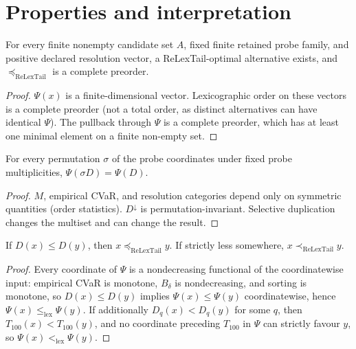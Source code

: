 \section{Properties and interpretation}
\label{sec:theory}
\begin{theorem}
For every finite nonempty candidate set $A$, fixed finite retained probe family, and positive declared resolution vector, a ReLexTail-optimal alternative exists, and $\preceq_{\mathrm{ReLexTail}}$ is a complete preorder.
\end{theorem}
\begin{proof}
$\Psi(x)$ is a finite-dimensional vector. Lexicographic order on these vectors is a complete preorder (not a total order, as distinct alternatives can have identical $\Psi$). The pullback through $\Psi$ is a complete preorder, which has at least one minimal element on a finite non-empty set.
\end{proof}

\begin{theorem}
For every permutation $\sigma$ of the probe coordinates under fixed probe multiplicities, $\Psi(\sigma D) = \Psi(D)$.
\end{theorem}
\begin{proof}
$M$, empirical CVaR, and resolution categories depend only on symmetric quantities (order statistics). $D^\downarrow$ is permutation-invariant. Selective duplication changes the multiset and can change the result.
\end{proof}

\begin{proposition}
If $D(x) \leq D(y)$, then $x \preceq_{\mathrm{ReLexTail}} y$. If strictly less somewhere, $x \prec_{\mathrm{ReLexTail}} y$.
\end{proposition}
\begin{proof}
Every coordinate of $\Psi$ is a nondecreasing functional of the coordinatewise input: empirical CVaR is monotone, $B_\delta$ is nondecreasing, and sorting is monotone, so $D(x) \leq D(y)$ implies $\Psi(x) \leq \Psi(y)$ coordinatewise, hence $\Psi(x) \leq_{\mathrm{lex}} \Psi(y)$. If additionally $D_q(x) < D_q(y)$ for some $q$, then $T_{100}(x) < T_{100}(y)$, and no coordinate preceding $T_{100}$ in $\Psi$ can strictly favour $y$, so $\Psi(x) <_{\mathrm{lex}} \Psi(y)$.
\end{proof}

